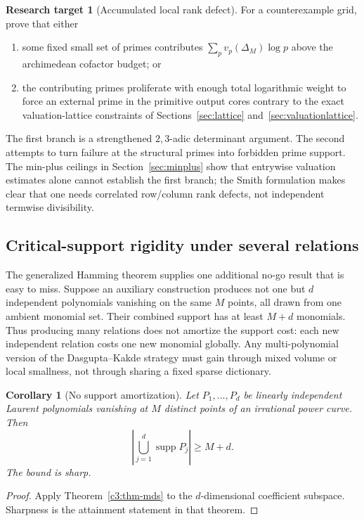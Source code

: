 \documentclass[11pt,oneside]{article}
\newtheorem{corollary}[theorem]{Corollary}
\theoremstyle{definition}
\newtheorem{target}[theorem]{Research target}
\theoremstyle{remark}
\newcommand{\supp}{\operatorname{supp}}
\begin{document}
\begin{target}[Accumulated local rank defect]
For a counterexample grid, prove that either
\begin{enumerate}
\item some fixed small set of primes contributes
      $\sum_pv_p(\Delta_M)\log p$ above the archimedean cofactor budget; or
\item the contributing primes proliferate with enough total logarithmic weight to force an
      external prime in the primitive output cores contrary to the exact valuation-lattice
      constraints of Sections~\ref{sec:lattice} and~\ref{sec:valuationlattice}.
\end{enumerate}
\end{target}

The first branch is a strengthened $2,3$-adic determinant argument.  The second attempts to
turn failure at the structural primes into forbidden prime support.  The min-plus ceilings in
Section~\ref{sec:minplus} show that entrywise valuation estimates alone cannot establish the
first branch; the Smith formulation makes clear that one needs correlated row/column rank
defects, not independent termwise divisibility.

\subsection{Critical-support rigidity under several relations}

The generalized Hamming theorem supplies one additional no-go result that is easy to miss.
Suppose an auxiliary construction produces not one but $d$ independent polynomials vanishing
on the same $M$ points, all drawn from one ambient monomial set.  Their combined support has
at least $M+d$ monomials.  Thus producing many relations does not amortize the support cost:
each new independent relation costs one new monomial globally.  Any multi-polynomial version
of the Dasgupta--Kakde strategy must gain through mixed volume or local smallness, not through
sharing a fixed sparse dictionary.

\begin{corollary}[No support amortization]
\label{c3:cor-no-amortization}
Let $P_1,\ldots,P_d$ be linearly independent Laurent polynomials vanishing at $M$ distinct
points of an irrational power curve.  Then
\[
 \left|\bigcup_{j=1}^{d}\supp P_j\right|\ge M+d.
\]
The bound is sharp.
\end{corollary}

\begin{proof}
Apply Theorem~\ref{c3:thm-mds} to the $d$-dimensional coefficient subspace.  Sharpness is the
attainment statement in that theorem.
\end{proof}
\end{document}
